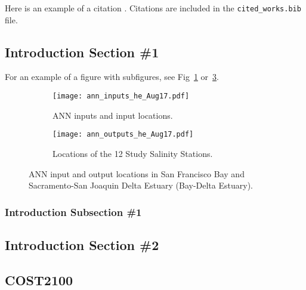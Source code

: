 
Here is an example of a citation \cite{ref:oetiker1995not}. Citations are included in the \texttt{cited\_works.bib} file.

\blindtext

\subsection{Introduction Section \#1}
\label{sect:intro_1}

For an example of a figure with subfigures, see Fig~\ref{fig:ann_inputs} or~\ref{fig:ann_outputs}.

\blindtext 

\begin{figure}[htbp]
	\begin{subfigure}[t]{.45\textwidth}
		\centering
		\texttt{[image: ann\_inputs\_he\_Aug17.pdf]}
		\caption{ANN inputs and input locations.}
		\label{fig:ann_inputs}
	\end{subfigure}
	\begin{subfigure}[t]{.45\textwidth}
		\centering
		\texttt{[image: ann\_outputs\_he\_Aug17.pdf]}
		\caption{Locations of the 12 Study Salinity Stations.}
		\label{fig:ann_outputs}
	\end{subfigure}
\caption{ANN input and output locations in San Francisco Bay and Sacramento-San Joaquin Delta Estuary (Bay-Delta Estuary).}
\end{figure}

\subsubsection{Introduction Subsection \#1}
\label{sect:intro_1}
\blindtext
\blindtext

\subsection{Introduction Section \#2}
\label{sect:intro_2}

\blindtext 

\subsection{COST2100}
\label{sect:cost2100}

